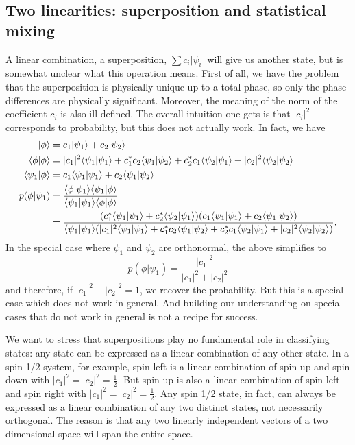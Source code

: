 \subsection{Two linearities: superposition and statistical mixing}

A linear combination, a superposition, $\sum c_i | \psi_i \>$ will give us another state, but is somewhat unclear what this operation means. First of all, we have the problem that the superposition is physically unique up to a total phase, so only the phase differences are physically significant. Moreover, the meaning of the norm of the coefficient $c_i$ is also ill defined. The overall intuition one gets is that $|c_i|^2$ corresponds to probability, but this does not actually work. In fact, we have
\begin{equation}
	\begin{aligned}
		|\phi\rangle &= c_1 |\psi_1\rangle + c_2 | \psi_2\rangle \\
		\langle \phi | \phi\rangle &= |c_1|^2 \langle \psi_1 |\psi_1\rangle + c_1^* c_2 \langle \psi_1 |\psi_2\rangle + c_2^* c_1 \langle \psi_2 |\psi_1\rangle + |c_2|^2 \langle \psi_2 |\psi_2\rangle \\
		\langle \psi_1 | \phi\rangle &= c_1 \langle \psi_1 |\psi_1\rangle + c_2 \langle \psi_1 |\psi_2\rangle \\
		p(\phi|\psi_1) &= \frac{\langle \phi | \psi_1 \rangle\langle \psi_1 | \phi \rangle}{\langle \psi_1 | \psi_1 \rangle\langle \phi | \phi \rangle} \\
		&= \frac{(c_1^* \langle \psi_1 |\psi_1\rangle + c_2^* \langle \psi_2 |\psi_1\rangle)(c_1 \langle \psi_1 |\psi_1\rangle + c_2 \langle \psi_1 |\psi_2\rangle)}{\langle \psi_1 | \psi_1 \rangle(|c_1|^2 \langle \psi_1 |\psi_1\rangle + c_1^* c_2 \langle \psi_1 |\psi_2\rangle + c_2^* c_1 \langle \psi_2 |\psi_1\rangle + |c_2|^2 \langle \psi_2 |\psi_2\rangle)}.
	\end{aligned}
\end{equation}
In the special case where $\psi_1$ and $\psi_2$ are orthonormal, the above simplifies to
\begin{equation}
	p(\phi|\psi_1) = \frac{|c_1|^2}{|c_1|^2 + |c_2|^2}
\end{equation}
and therefore, if $|c_1|^2 + |c_2|^2 = 1$, we recover the probability. But this is a special case which does not work in general. And building our understanding on special cases that do not work in general is not a recipe for success.

We want to stress that superpositions play no fundamental role in classifying states: any state can be expressed as a linear combination of any other state. In a spin 1/2 system, for example, spin left is a linear combination of spin up and spin down with $|c_1|^2=|c_2|^2=\frac{1}{2}$. But spin up is also a linear combination of spin left and spin right with $|c_1|^2=|c_2|^2=\frac{1}{2}$. Any spin 1/2 state, in fact, can always be expressed as a linear combination of any two distinct states, not necessarily orthogonal. The reason is that any two linearly independent vectors of a two dimensional space will span the entire space.

